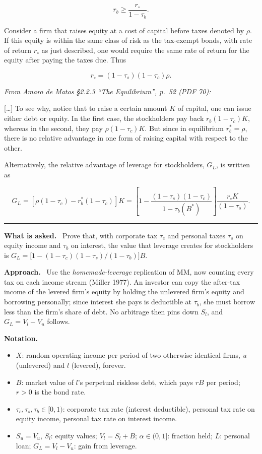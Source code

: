 \documentclass[11pt,a4paper]{article}
\numberwithin{equation}{section}
\newcommand{\notation}{\par\smallskip\noindent\textbf{Notation.}}
\newcommand{\asked}{\par\medskip\noindent\textbf{What is asked.}~}
\newcommand{\approach}{\par\smallskip\noindent\textbf{Approach.}~}
\newcommand{\stmtend}{\par\endgroup\nopagebreak\noindent\rule{\linewidth}{0.4pt}\par\medskip}
\begin{document}
\[r_b \ge \frac{r_\circ}{1 - \tau_b}.\]

Consider a firm that raises equity at a cost of capital before taxes denoted by \(\rho\). If this
equity is within the same class of risk as the tax-exempt bonds, with rate of return \(r_\circ\) as
just described, one would require the same rate of return for the equity after paying the taxes due.
Thus

\[r_\circ = (1 - \tau_s)(1 - \tau_c)\rho.\]

\emph{From Amaro de Matos §2.2.3 ``The Equilibrium'', p.~52 (PDF 70):}

{[}\ldots{]} To see why, notice that to raise a certain amount \(K\) of capital, one can issue
either debt or equity. In the first case, the stockholders pay back \(r_b(1 - \tau_c)K\), whereas in
the second, they pay \(\rho(1 - \tau_c)K\). But since in equilibrium \(r_b^* = \rho\), there is no
relative advantage in one form of raising capital with respect to the other.

Alternatively, the relative advantage of leverage for stockholders, \(G_L\), is written as

\[G_L = [\rho(1 - \tau_c) - r_b^*(1 - \tau_c)]K = \left[1 - \frac{(1 - \tau_s)(1 - \tau_c)}{1 - \tau_b(B^*)}\right]\frac{r_\circ K}{(1 - \tau_s)}.\]
\stmtend

\asked
Prove that, with corporate tax $\tau_c$ and personal taxes $\tau_s$ on equity income and $\tau_b$
on interest, the value that leverage creates for stockholders is
$G_L=\bigl[1-(1-\tau_c)(1-\tau_s)/(1-\tau_b)\bigr]B$.

\approach
Use the \emph{homemade-leverage} replication of MM, now counting every tax on each income
stream (Miller 1977). An investor can copy the after-tax income of the levered firm's equity by
holding the unlevered firm's equity and borrowing personally; since interest she pays is
deductible at $\tau_b$, she must borrow less than the firm's share of debt. No arbitrage then
pins down $S_l$, and $G_L=V_l-V_u$ follows.

\notation
\begin{itemize}
  \item $X$: random operating income per period of two otherwise identical firms, $u$ (unlevered) and $l$ (levered), forever.
  \item $B$: market value of $l$'s perpetual riskless debt, which pays $rB$ per period; $r>0$ is the bond rate.
  \item $\tau_c,\tau_s,\tau_b\in[0,1)$: corporate tax rate (interest deductible), personal tax rate on equity income, personal tax rate on interest income.
  \item $S_u=V_u$, $S_l$: equity values; $V_l=S_l+B$; $\alpha\in(0,1]$: fraction held; $L$: personal loan; $G_L=V_l-V_u$: gain from leverage.
\end{itemize}
\end{document}
